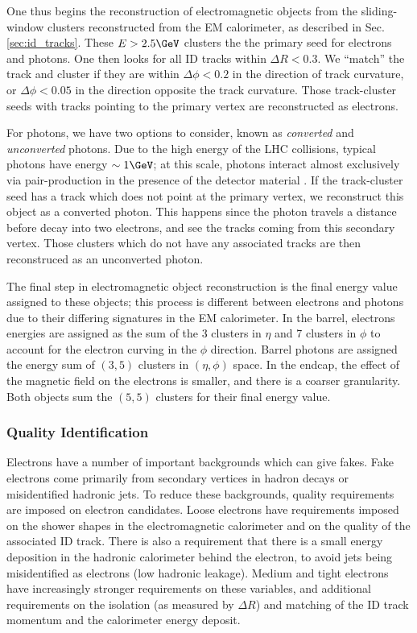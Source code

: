 One thus begins the reconstruction of electromagnetic objects from the sliding-window clusters reconstructed from the EM calorimeter, as described in Sec.\ref{sec:id_tracks}.
These $E > 2.5 \GeV$ clusters the the primary seed for electrons and photons.
One then looks for all ID tracks within $\Delta R < 0.3$.
We ``match'' the track and cluster if they are within $\Delta \phi < 0.2$ in the direction of track curvature, or $\Delta \phi < 0.05$ in the direction opposite the track curvature.
Those track-cluster seeds with tracks pointing to the primary vertex are reconstructed as electrons.

For photons, we have two options to consider, known as \textit{converted} and \textit{unconverted} photons.
Due to the high energy of the LHC collisions, typical photons have energy $\order 1 \GeV$; at this scale, photons interact almost exclusively via pair-production in the presence of the detector material .
If the track-cluster seed has a track which does not point at the primary vertex, we reconstruct this object as a converted photon.
This happens since the photon travels a distance before decay into two electrons, and see the tracks coming from this secondary vertex.
Those clusters which do not have any associated tracks are then reconstruced as an unconverted photon.

The final step in electromagnetic object reconstruction is the final energy value assigned to these objects; this process is different between electrons and photons due to their differing signatures in the EM calorimeter.
In the barrel, electrons energies are assigned as the sum of the 3 clusters in $\eta$ and 7 clusters in $\phi$ to account for the electron curving in the $\phi$ direction.
Barrel photons are assigned the energy sum of $(3,5)$ clusters in $(\eta, \phi)$ space.
In the endcap, the effect of the magnetic field on the electrons is smaller, and there is a coarser granularity.
Both objects sum the $(5,5)$ clusters for their final energy value.

\subsubsection{Quality Identification}

Electrons have a number of important backgrounds which can give fakes.
Fake electrons come primarily from secondary vertices in hadron decays or misidentified hadronic jets.
To reduce these backgrounds, quality requirements are imposed on electron candidates.
Loose electrons have requirements imposed on the shower shapes in the electromagnetic calorimeter and on the quality of the associated ID track.
There is also a requirement that there is a small energy deposition in the hadronic calorimeter behind the electron, to avoid jets being misidentified as electrons (low hadronic leakage).
Medium and tight electrons have increasingly stronger requirements on these variables, and additional requirements on the isolation (as measured by $\Delta R$) and matching of the ID track momentum and the calorimeter energy deposit.

